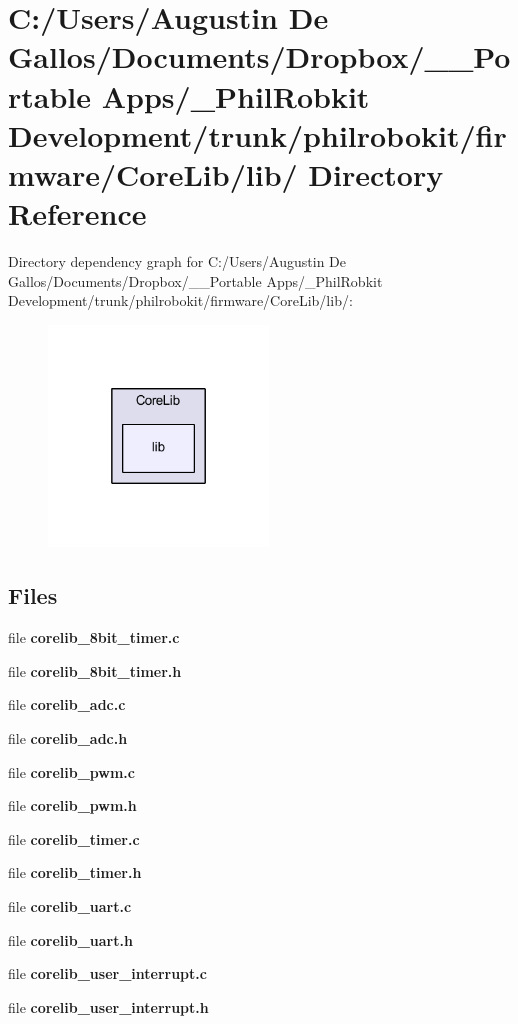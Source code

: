 \section{C\-:/\-Users/\-Augustin De Gallos/\-Documents/\-Dropbox/\-\_\-\-\_\-\-Portable Apps/\-\_\-\-Phil\-Robkit Development/trunk/philrobokit/firmware/\-Core\-Lib/lib/ Directory Reference}
\label{dir_37998502aaf4b1c5fd4660ed35a74798}
Directory dependency graph for C\-:/\-Users/\-Augustin De Gallos/\-Documents/\-Dropbox/\-\_\-\-\_\-\-Portable Apps/\-\_\-\-Phil\-Robkit Development/trunk/philrobokit/firmware/\-Core\-Lib/lib/\-:\nopagebreak
\begin{figure}[H]
\begin{center}
\leavevmode
\includegraphics[width=166pt]{dir_37998502aaf4b1c5fd4660ed35a74798_dep}
\end{center}
\end{figure}
\subsection*{Files}
\begin{DoxyCompactItemize}
\item 
file {\bf corelib\-\_\-8bit\-\_\-timer.\-c}
\item 
file {\bf corelib\-\_\-8bit\-\_\-timer.\-h}
\item 
file {\bf corelib\-\_\-adc.\-c}
\item 
file {\bf corelib\-\_\-adc.\-h}
\item 
file {\bf corelib\-\_\-pwm.\-c}
\item 
file {\bf corelib\-\_\-pwm.\-h}
\item 
file {\bf corelib\-\_\-timer.\-c}
\item 
file {\bf corelib\-\_\-timer.\-h}
\item 
file {\bf corelib\-\_\-uart.\-c}
\item 
file {\bf corelib\-\_\-uart.\-h}
\item 
file {\bf corelib\-\_\-user\-\_\-interrupt.\-c}
\item 
file {\bf corelib\-\_\-user\-\_\-interrupt.\-h}
\end{DoxyCompactItemize}
